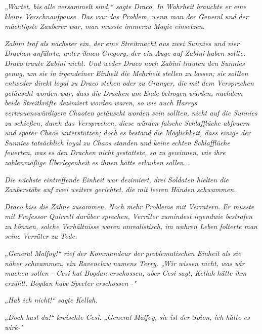 {\emph{„Wartet, bis} \emph{alle versammelt sind,“ sagte Draco. In Wahrheit brauchte er eine kleine Verschnaufpause. Das war das Problem, wenn man der General} \emph{\emph{und}} \emph{der mächtigste Zauberer war, man musste} \emph{immerzu} \emph{Magie einsetzen.}

\emph{Zabini traf als nächster ein,} \emph{der} \emph{eine Streitmacht aus zwei Sunnies und vier Drachen anführte,} \emph{unter ihnen Gregory, der ein Auge auf Zabini haben sollte. Draco traute Zabini nicht. Und weder Draco noch Zabini trauten den Sunnies genug, um sie in irgendeiner Einheit die Mehrheit stellen zu lassen; sie} \emph{\emph{sollten}} \emph{entweder direkt loyal zu Draco stehen oder zu Granger, die} \emph{mit} \emph{dem Versprechen getäuscht worden war, dass die Drachen am Ende betrogen würden, nachdem beide Streitkräfte dezimiert worden waren, so wie auch Harrys vertrauenswürdigere Chaoten getäuscht worden sein sollten, nicht auf die Sunnies zu schießen, durch das Versprechen, diese würden falsche Schlafflüche abfeuern und später Chaos unterstützen; doch es bestand die Möglichkeit, dass einige der Sunnies tatsächlich loyal zu Chaos} \emph{\emph{standen}} \emph{und} \emph{\emph{keine}} \emph{echten Schlafflüche feuerten, was} \emph{es den Drachen} \emph{nicht} \emph{gestattete, so zu gewinnen, wie ihre zahlenmäßige Überlegenheit es ihnen hätte erlauben} \emph{sollen...}

\emph{Die nächste} \emph{eintreffende} \emph{Einheit war dezimiert, drei Soldaten hielten die Zauberstäbe auf zwei} \emph{weitere} \emph{gerichtet, die mit leeren Händen schwammen.}

\emph{Draco biss die Zähne zusammen. Noch mehr} \emph{Probleme mit Verrätern.} \emph{Er musste mit Professor Quirrell darüber sprechen, Verräter zumindest irgendwie} \emph{\emph{bestrafen}} \emph{zu können, solche Verhältnisse waren} \emph{\emph{unrealistisch,}} \emph{im wahren Leben folterte man seine Verräter zu Tode.}

\emph{„General Malfoy!“ rief der Kommandeur der} \emph{problematischen} \emph{Einheit als sie näher schwammen, ein Ravenclaw namens Terry. „Wir wissen nicht, was wir machen sollen - Cesi hat Bogdan erschossen, aber Cesi sagt, Kellah hätte ihm erzählt, Bogdan habe Specter erschossen -"}

\emph{„Hab ich} \emph{\emph{nicht!}“ sagte Kellah.}

\emph{„Doch} \emph{\emph{hast du!}“ kreischte Cesi. „General Malfoy,} \emph{\emph{sie}} \emph{ist} \emph{der Spion, ich hätte es wirk-"}

}
